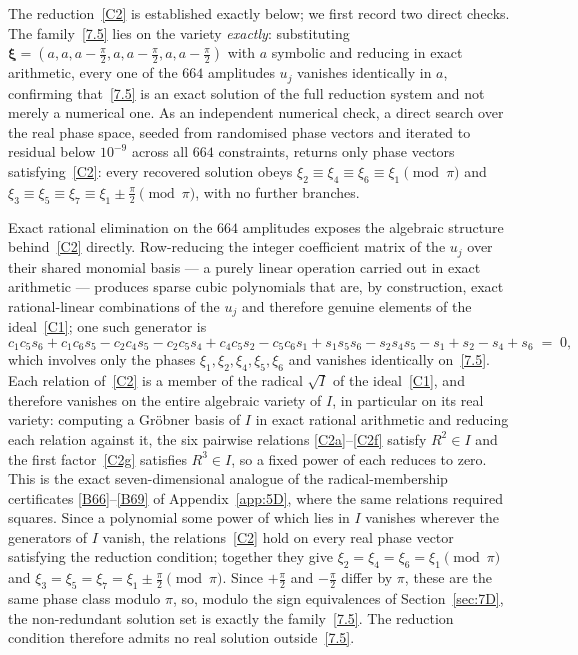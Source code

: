 \documentclass[11pt]{jfm}
\numberwithin{equation}{section}
\begin{document}
The reduction~\eqref{C2} is established exactly below; we first record two direct
checks. The family~\eqref{7.5} lies on the variety \emph{exactly}: substituting
$\boldsymbol{\xi}=(a,a,a-\tfrac{\pi}{2},a,a-\tfrac{\pi}{2},a,a-\tfrac{\pi}{2})$
with $a$ symbolic and reducing in exact arithmetic, every one of the $664$
amplitudes $u_j$ vanishes identically in $a$, confirming that~\eqref{7.5} is an
exact solution of the full reduction system and not merely a numerical one.
As an independent numerical check, a direct search over the real phase space, seeded from randomised
phase vectors and iterated to residual below $10^{-9}$ across all $664$
constraints, returns only phase vectors satisfying~\eqref{C2}: every recovered
solution obeys $\xi_2\equiv\xi_4\equiv\xi_6\equiv\xi_1\pmod{\pi}$ and
$\xi_3\equiv\xi_5\equiv\xi_7\equiv\xi_1\pm\tfrac{\pi}{2}\pmod{\pi}$, with no
further branches.

Exact rational elimination on the $664$ amplitudes exposes the algebraic
structure behind~\eqref{C2} directly. Row-reducing the integer coefficient
matrix of the $u_j$ over their shared monomial basis --- a purely linear
operation carried out in exact arithmetic --- produces sparse cubic polynomials
that are, by construction, exact rational-linear combinations of the $u_j$ and
therefore genuine elements of the ideal~\eqref{C1}; one such generator is
\begin{equation}
\label{C3}
c_1c_5s_6+c_1c_6s_5-c_2c_4s_5-c_2c_5s_4+c_4c_5s_2-c_5c_6s_1
+s_1s_5s_6-s_2s_4s_5-s_1+s_2-s_4+s_6 \;=\; 0,
\end{equation}
which involves only the phases $\xi_1,\xi_2,\xi_4,\xi_5,\xi_6$ and
vanishes identically on~\eqref{7.5}. Each relation of~\eqref{C2} is a member of
the radical $\sqrt{I}$ of the ideal~\eqref{C1}, and therefore vanishes on the
entire algebraic variety of $I$, in particular on its real variety: computing a
Gr\"obner basis of $I$ in exact rational arithmetic and
reducing each relation against it, the six pairwise relations
\eqref{C2a}--\eqref{C2f} satisfy $R^2\in I$ and the first factor~\eqref{C2g}
satisfies $R^3\in I$, so a fixed power of each reduces to zero. This is the exact
seven-dimensional analogue of the radical-membership certificates
\eqref{B66}--\eqref{B69} of Appendix~\ref{app:5D}, where the same
relations required squares. Since a polynomial some power of which lies in $I$
vanishes wherever the generators of $I$ vanish, the relations~\eqref{C2} hold on
every real phase vector satisfying the reduction condition; together they give
$\xi_2=\xi_4=\xi_6=\xi_1\pmod{\pi}$ and
$\xi_3=\xi_5=\xi_7=\xi_1\pm\tfrac{\pi}{2}\pmod{\pi}$. Since $+\tfrac{\pi}{2}$
and $-\tfrac{\pi}{2}$ differ by $\pi$, these are the same phase class modulo
$\pi$, so, modulo the sign equivalences of Section~\ref{sec:7D}, the
non-redundant solution set is exactly the family~\eqref{7.5}. The reduction
condition therefore admits no real solution outside~\eqref{7.5}.
\end{document}
